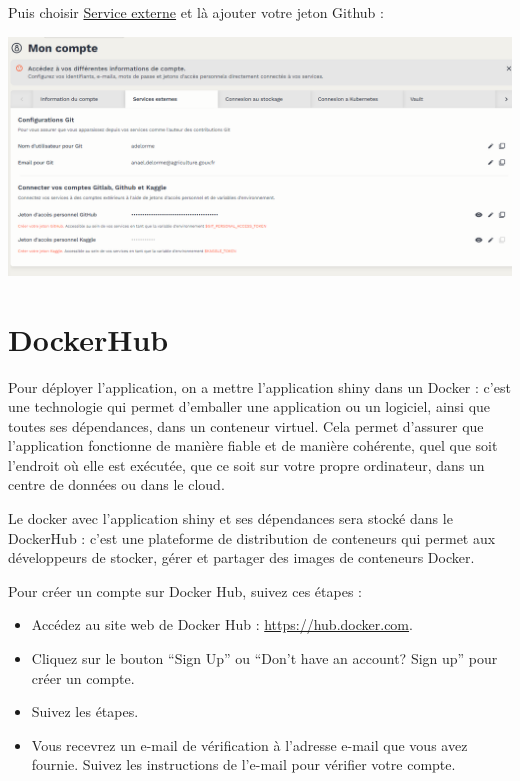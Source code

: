 \documentclass[
  letterpaper,
  DIV=11,
  numbers=noendperiod]{scrreprt}
\providecommand{\tightlist}{%
  \setlength{\itemsep}{0pt}\setlength{\parskip}{0pt}}\usepackage{longtable,booktabs,array}
\begin{document}
Puis choisir
\href{https://datalab.sspcloud.fr/account/third-party-integration}{Service
externe} et là ajouter votre jeton Github :

\includegraphics{./images/datalab_jeton_perso.png}

\hypertarget{dockerhub}{%
\section{DockerHub}\label{dockerhub}}

Pour déployer l'application, on a mettre l'application shiny dans un
Docker : c'est une technologie qui permet d'emballer une application ou
un logiciel, ainsi que toutes ses dépendances, dans un conteneur
virtuel. Cela permet d'assurer que l'application fonctionne de manière
fiable et de manière cohérente, quel que soit l'endroit où elle est
exécutée, que ce soit sur votre propre ordinateur, dans un centre de
données ou dans le cloud.

Le docker avec l'application shiny et ses dépendances sera stocké dans
le DockerHub : c'est une plateforme de distribution de conteneurs qui
permet aux développeurs de stocker, gérer et partager des images de
conteneurs Docker.

Pour créer un compte sur Docker Hub, suivez ces étapes :

\begin{itemize}
\tightlist
\item
  Accédez au site web de Docker Hub : \url{https://hub.docker.com}.\\
\item
  Cliquez sur le bouton ``Sign Up'' ou ``Don't have an account? Sign
  up'' pour créer un compte.\\
\item
  Suivez les étapes.\\
\item
  Vous recevrez un e-mail de vérification à l'adresse e-mail que vous
  avez fournie. Suivez les instructions de l'e-mail pour vérifier votre
  compte.
\end{itemize}
\end{document}
